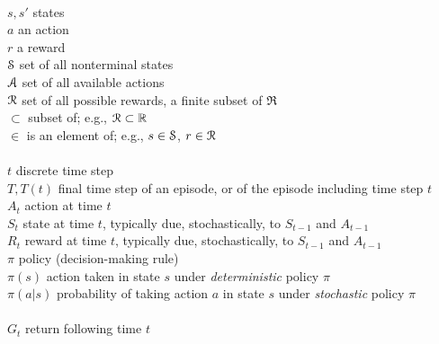 \documentclass[a4paper, twoside, 12pt]{article}
\begin{document}
\begin{tabbing}
    \\
    \>$s, s'$             \> states\\
    \>$a$                 \> an action\\
    \>$r$                 \> a reward\\
    \>$\S$                \> set of all nonterminal states \\
    \>$\A$                \> set of all available actions\\
    \>$\R$                \> set of all possible rewards, a finite subset of $\Re$\\
    \>$\subset$           \> subset of; e.g., $\R\subset\Re$\\
    \>$\in$               \> is an element of; e.g., $s\in\S$, $r\in\R$\\
    \\
    \>$t$                 \> discrete time step\\
    \>$T, T(t)$           \> final time step of an episode, or of the episode including time step $t$\\
    \>$A_t$               \> action at time $t$\\
    \>$S_t$               \> state at time $t$, typically due, stochastically, to $S_{t-1}$ and $A_{t-1}$\\
    \>$R_t$               \> reward at time $t$, typically due, stochastically, to $S_{t-1}$ and $A_{t-1}$\\
    \>$\pi$               \> policy (decision-making rule)\\
    \>$\pi(s)$            \> action taken in state $s$ under {\it deterministic\/} policy $\pi$\\
    \>$\pi(a|s)$          \> probability of taking action $a$ in state $s$ under {\it stochastic\/} policy $\pi$\\
    \\
    \>$G_t$               \> return following time $t$\\

\end{tabbing}
\end{document}
